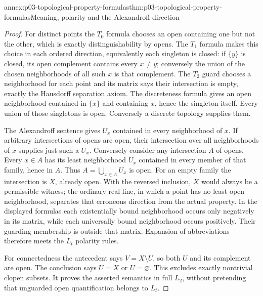 \begin{annexitem}{annex:p03-topological-property-formulas}{thm:p03-topological-property-formulas}{Meaning, polarity and the Alexandroff direction}
\begin{proof}
For distinct points the \(T_0\) formula chooses an open containing
one but not the other, which is exactly distinguishability by opens.
The \(T_1\) formula makes this choice in each ordered direction,
equivalently each singleton is closed: if \(\{y\}\) is closed,
its open complement contains every \(x\ne y\); conversely the union
of the chosen neighborhoods of all such \(x\) is that complement.
The \(T_2\) guard chooses a neighborhood for each point and its matrix
says their intersection is empty, exactly the Hausdorff separation axiom.
The discreteness formula gives an open neighborhood contained in \(\{x\}\)
and containing \(x\), hence the singleton itself. Every union of those
singletons is open. Conversely a discrete topology supplies them.

The Alexandroff sentence gives \(U_x\) contained in every neighborhood
of \(x\). If arbitrary intersections of opens are open, their intersection
over all neighborhoods of \(x\) supplies just such a \(U_x\).
Conversely consider any intersection \(A\) of opens. Every \(x\in A\)
has its least neighborhood \(U_x\) contained in every member of that
family, hence in \(A\). Thus \(A=\bigcup_{x\in A}U_x\) is open.
For an empty family the intersection is \(X\), already open. With the
reversed inclusion, \(X\) would always be a permissible witness; the
ordinary real line, in which a point has no least open neighborhood,
separates that erroneous direction from the actual property.
In the displayed formulas each existentially bound neighborhood occurs
only negatively in its matrix, while each universally bound neighborhood
occurs positively. Their guarding membership is outside that matrix.
Expansion of abbreviations therefore meets the \(L_t\) polarity rules.

For connectedness the antecedent says \(V=X\setminus U\), so both
\(U\) and its complement are open. The conclusion says \(U=X\) or
\(U=\varnothing\). This excludes exactly nontrivial clopen subsets.
It proves the asserted semantics in full \(L_2\), without pretending
that unguarded open quantification belongs to \(L_t\).
\end{proof}
\end{annexitem}

